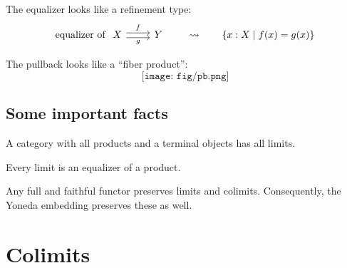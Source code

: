 The equalizer looks like a refinement type:
\[
\text{equalizer of }
\begin{tikzcd}
X \arrow[r, "g"', shift right] \arrow[r, "f", shift left] & Y
\end{tikzcd}
\qquad\leadsto\qquad
\{x : X \mid f(x) = g(x)\}
\]

The pullback looks like a ``fiber product'':
\[\texttt{[image: fig/pb.png]}\]


\subsection{Some important facts}

\begin{proposition}
  A category with all products and a terminal objects has all limits.
\end{proposition}

\begin{proposition}
  Every limit is an equalizer of a product.
\end{proposition}

\begin{proposition}
  Any full and faithful functor preserves limits and colimits.
  Consequently,
  the Yoneda embedding preserves these as well.
\end{proposition}

\section{Colimits}